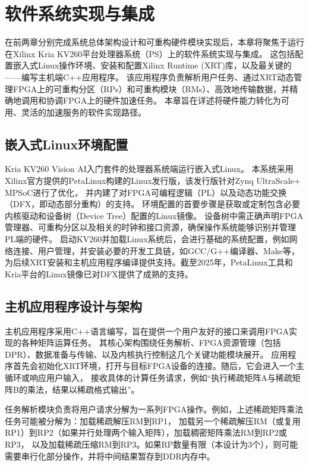 \chapter{软件系统实现与集成}

在前两章分别完成系统总体架构设计和可重构硬件模块实现后，本章将聚焦于运行在Xilinx Kria KV260平台处理器系统（PS）上的软件系统实现与集成。
这包括配置嵌入式Linux操作环境、安装和配置Xilinx Runtime (XRT)库，以及最关键的——编写主机端C++应用程序。
该应用程序负责解析用户任务、通过XRT动态管理FPGA上的可重构分区（RPs）和可重构模块（RMs）、高效地传输数据，并精确地调用和协调FPGA上的硬件加速任务。
本章旨在详述将硬件能力转化为可用、灵活的加速服务的软件实现路径。

\section{嵌入式Linux环境配置}

Kria KV260 Vision AI入门套件的处理器系统端运行嵌入式Linux。
本系统采用Xilinx官方提供的PetaLinux构建的Linux发行版，该发行版针对Zynq UltraScale+ MPSoC进行了优化，
并内建了对FPGA可编程逻辑（PL）以及动态功能交换（DFX，即动态部分重构）的支持。
环境配置的首要步骤是获取或定制包含必要内核驱动和设备树（Device Tree）配置的Linux镜像。
设备树中需正确声明FPGA管理器、可重构分区以及相关的时钟和接口资源，确保操作系统能够识别并管理PL端的硬件。
启动KV260并加载Linux系统后，会进行基础的系统配置，例如网络连接、用户管理，并安装必要的开发工具链，如GCC/G++编译器、Make等，
为后续XRT安装和主机应用程序编译提供支持。截至2025年，PetaLinux工具和Kria平台的Linux镜像已对DFX提供了成熟的支持。

\section{主机应用程序设计与架构}

主机应用程序采用C++语言编写，旨在提供一个用户友好的接口来调用FPGA实现的各种矩阵运算任务。
其核心架构围绕任务解析、FPGA资源管理（包括DPR）、数据准备与传输、以及内核执行控制这几个关键功能模块展开。
应用程序首先会初始化XRT环境，打开与目标FPGA设备的连接。随后，它会进入一个主循环或响应用户输入，
接收具体的计算任务请求，例如“执行稀疏矩阵A与稀疏矩阵B的乘法，结果以稀疏格式输出”。

任务解析模块负责将用户请求分解为一系列FPGA操作。例如，上述稀疏矩阵乘法任务可能被分解为：加载稀疏解压RM到RP1，
加载另一个稀疏解压RM（或复用RP1）到RP2（如果并行处理两个输入矩阵），加载稠密矩阵乘法RM到RP2或RP3，
以及加载稀疏压缩RM到RP3。如果RP数量有限（本设计为3个），则可能需要串行化部分操作，并将中间结果暂存到DDR内存中。
